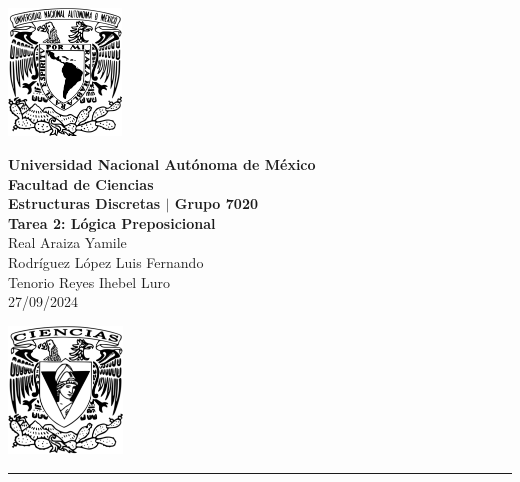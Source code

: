 \documentclass[11pt,letterpaper]{article}
\begin{document}

\begin{center}
    \begin{minipage}{3cm}
    	\begin{center}
    		\includegraphics[height=3.4cm]{./imagenes/logo_unam.png}
    	\end{center}
    \end{minipage}\hfill
    \begin{minipage}{10cm}
    	\begin{center}
    	\textbf{\large Universidad Nacional Autónoma de México}\\[0.1cm]
        \textbf{Facultad de Ciencias}\\[0.1cm]
        \textbf{Estructuras Discretas $|$ Grupo 7020}\\[0.1cm]
        \textbf{Tarea 2: Lógica Preposicional}\\[0.1cm]
        Real Araiza Yamile\\[0.1cm]
        Rodríguez López Luis Fernando\\[0.1cm]
        Tenorio Reyes Ihebel Luro\\[0.1cm]
        27/09/2024
    	\end{center}
    \end{minipage}\hfill
    \begin{minipage}{3cm}
    	\begin{center}
    		\includegraphics[height=3.4cm]{./imagenes/Logo_FC.png}
    	\end{center}
    \end{minipage}
\end{center}

\rule{17cm}{0.1mm}

\end{document}
